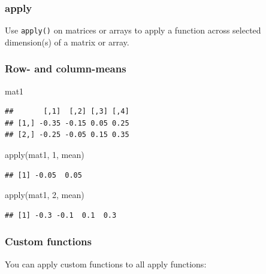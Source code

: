 \documentclass[
  11pt,
]{article}
\newenvironment{Shaded}{\begin{snugshade}}{\end{snugshade}}
\newcommand{\DecValTok}[1]{\textcolor[rgb]{0.00,0.00,0.81}{#1}}
\newcommand{\FunctionTok}[1]{\textcolor[rgb]{0.00,0.00,0.00}{#1}}
\newcommand{\NormalTok}[1]{#1}
\begin{document}
\hypertarget{apply}{%
\subsubsection{apply}\label{apply}}

Use \texttt{apply()} on matrices or arrays to apply a function across selected dimension(s) of a matrix or array.

\hypertarget{row--and-column-means}{%
\subsubsection{Row- and column-means}\label{row--and-column-means}}

\begin{Shaded}
\begin{Highlighting}[]
\NormalTok{mat1}
\end{Highlighting}
\end{Shaded}

\begin{verbatim}
##       [,1]  [,2] [,3] [,4]
## [1,] -0.35 -0.15 0.05 0.25
## [2,] -0.25 -0.05 0.15 0.35
\end{verbatim}

\begin{Shaded}
\begin{Highlighting}[]
\FunctionTok{apply}\NormalTok{(mat1, }\DecValTok{1}\NormalTok{, mean)}
\end{Highlighting}
\end{Shaded}

\begin{verbatim}
## [1] -0.05  0.05
\end{verbatim}

\begin{Shaded}
\begin{Highlighting}[]
\FunctionTok{apply}\NormalTok{(mat1, }\DecValTok{2}\NormalTok{, mean)}
\end{Highlighting}
\end{Shaded}

\begin{verbatim}
## [1] -0.3 -0.1  0.1  0.3
\end{verbatim}

\hypertarget{custom-functions}{%
\subsubsection{Custom functions}\label{custom-functions}}

You can apply custom functions to all apply functions:
\end{document}
